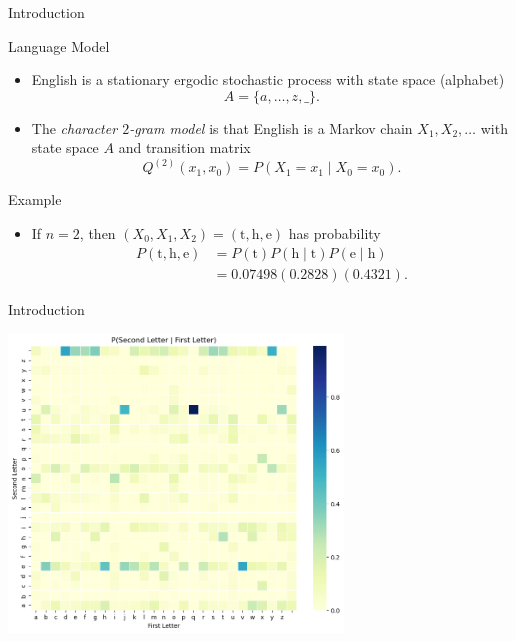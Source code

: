 \documentclass{beamer}
\begin{document}
\begin{frame}{Introduction}

\begin{block}{Language Model \cite{menon2020pattern}}
\begin{itemize}
\item English is a stationary ergodic stochastic process with state space (alphabet)
$$A = \{a, \ldots, z, \_\}.$$
\item The \textit{character $2$-gram model} is that English is a Markov chain $X_{1}, X_{2}, \ldots$ with state space $A$ and transition matrix 
$$Q^{(2)}(x_{1}, x_{0}) = P(X_{1} = x_{1} \mid X_{0} = x_{0}).$$
\end{itemize}
\end{block}

\begin{block}{Example}
\begin{itemize}
\item If $n = 2$, then $(X_{0}, X_{1}, X_{2}) = (\text{t}, \text{h}, \text{e})$ has probability 
\begin{align*}
P(\text{t}, \text{h}, \text{e}) &= P(\text{t}) P(\text{h} \mid \text{t}) P(\text{e} \mid \text{h}) \\
                              &= 0.07498(0.2828)(0.4321).
\end{align*}
\end{itemize}
\end{block}

\end{frame}


\begin{frame}{Introduction}

\begin{center} \includegraphics[width=3.5in]{images/heatmap.png} \end{center}

\end{frame}
\end{document}
